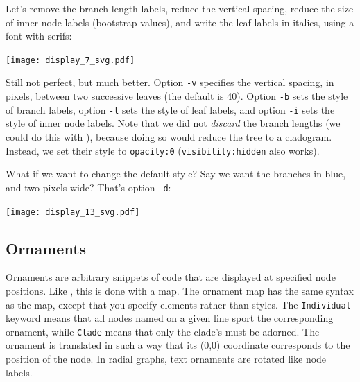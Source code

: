 \noindent{}Let's remove the branch length labels, reduce
the vertical spacing, reduce the size of inner node labels (bootstrap values),
and write the leaf labels in italics, using a font with serifs:


\begin{center}
  \texttt{[image: display\_7\_svg.pdf]}
\end{center}

\noindent{}Still not perfect, but much better. Option \texttt{-v} specifies the
vertical spacing, in pixels, between two successive leaves (the default is 40).
Option \texttt{-b} sets the style of branch labels, option \texttt{-l} sets the
style of leaf labels, and option \texttt{-i} sets the style of inner node
labels. Note that we did not \emph{discard} the branch lengths (we could do
this with \topology), because doing so would reduce the tree to a cladogram.
Instead, we set their \css{} style to \texttt{opacity:0}
(\texttt{visibility:hidden} also works).

What if we want to change the default style? Say we want the branches in blue,
and two pixels wide? That's option \texttt{-d}:


\begin{center}
  \texttt{[image: display\_13\_svg.pdf]}
\end{center}

\subsection{Ornaments}

Ornaments are arbitrary snippets of \svg{} code that are displayed at specified
node positions. Like \css, this is done with a map. The ornament map has the
same syntax as the \css{} map, except that you specify \svg{} elements rather
than \css{} styles. The \texttt{Individual} keyword means that all nodes named
on a given line sport the corresponding ornament, while \texttt{Clade} means
that only the clade's \lca{} must be adorned. The ornament is translated in
such a way that its (0,0) coordinate corresponds to the position of the node.
In radial graphs, text ornaments are rotated like node labels.

